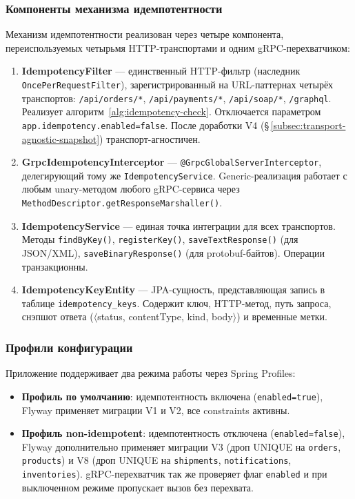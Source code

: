 \subsubsection{Компоненты механизма идемпотентности}

Механизм идемпотентности реализован через четыре компонента, переиспользуемых четырьмя HTTP-транспортами и одним gRPC-перехватчиком:

\begin{enumerate}
    \item \textbf{IdempotencyFilter} --- единственный HTTP-фильтр (наследник \mbox{\texttt{OncePerRequestFilter}}), зарегистрированный на URL-паттернах четырёх транспортов: \texttt{/api/orders/*}, \texttt{/api/payments/*}, \texttt{/api/soap/*}, \texttt{/graphql}. Реализует алгоритм~\ref{alg:idempotency-check}. Отключается параметром \mbox{\texttt{app.idempotency.enabled=false}}. После доработки V4 (\S\,\ref{subsec:transport-agnostic-snapshot}) транспорт-агностичен.

    \item \textbf{GrpcIdempotencyInterceptor} --- \texttt{@GrpcGlobalServerInterceptor}, делегирующий тому же \texttt{IdempotencyService}. Generic-реализация работает с любым unary-методом любого gRPC-сервиса через \texttt{MethodDescriptor.getResponseMarshaller()}.

    \item \textbf{IdempotencyService} --- единая точка интеграции для всех транспортов. Методы \texttt{findByKey()}, \texttt{registerKey()}, \texttt{saveTextResponse()} (для JSON/XML), \texttt{saveBinaryResponse()} (для protobuf-байтов). Операции транзакционны.

    \item \textbf{IdempotencyKeyEntity} --- JPA-сущность, представляющая запись в таблице \texttt{idempotency\_keys}. Содержит ключ, HTTP-метод, путь запроса, снэпшот ответа ($\langle$status, contentType, kind, body$\rangle$) и временные метки.
\end{enumerate}

\subsubsection{Профили конфигурации}

Приложение поддерживает два режима работы через Spring Profiles:

\begin{itemize}
    \item \textbf{Профиль по умолчанию}: идемпотентность включена (\mbox{\texttt{enabled=true}}), Flyway применяет миграции V1 и V2, все constraints активны.

    \item \textbf{Профиль non-idempotent}: идемпотентность отключена (\mbox{\texttt{enabled=false}}), Flyway дополнительно применяет миграции V3 (дроп UNIQUE на \texttt{orders}, \texttt{products}) и V8 (дроп UNIQUE на \texttt{shipments}, \texttt{notifications}, \texttt{inventories}). gRPC-перехватчик так же проверяет флаг \texttt{enabled} и при выключенном режиме пропускает вызов без перехвата.
\end{itemize}


